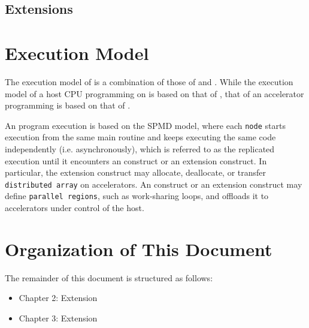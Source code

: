 \subsection{{\OACC} Extensions}

\section{Execution Model}
The execution model of {\XACC} is a combination of those of {\XMP} and {\OACC}.
While the execution model of a host CPU programming on {\XACC} is based on that of {\XMP},
that of an accelerator programming is based on that of {\OACC}.

An {\XACC} program execution is based on the SPMD model, 
where each {\tt node} starts execution from the same main routine and keeps executing the same code independently (i.e. asynchronously), 
which is referred to as the replicated execution
until it encounters an {\XMP} construct or an {\XMP} extension construct.
In particular,
the {\XMP} extension construct may allocate, deallocate, or transfer {\tt distributed array} on accelerators.
An {\OACC} construct or an {\OACC} extension construct may define {\tt parallel regions}, such as work-sharing loops, 
and offloads it to accelerators under control of the host.

\section{Organization of This Document}
The remainder of this document is structured as follows:

\begin{itemize}
 \item Chapter 2: {\XMP} Extension
 \item Chapter 3: {\OACC} Extension
\end{itemize}
